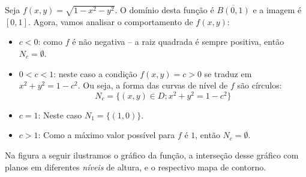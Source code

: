 \begin{example}{}{}
Seja \(f(x,y) = \sqrt{1-x^2 - y^2}\). O domínio desta função é $\overline{B(0,1)}$ e a imagem é $[0,1]$. Agora, vamos analisar o comportamento de \(f(x,y)\):
\begin{itemize}[label=\color{examplescolor}\textbullet]

\item $c<0$: como $f$ é não negativa -- a raiz quadrada é sempre positiva, então $N_c=\emptyset$.


\item $0<c<1$: neste caso a condição $f(x,y)=c>0$ se traduz em $x^2+y^2=1-c^2$. Ou seja, a forma das curvas de nível de $f$ são círculos:
$$N_c=\{(x,y)\in D; x^2+y^2=1-c^2\}$$


\item $c=1$: Neste caso $N_1=\{(1,0)\}$. 

\item $c>1$: Como a máximo valor possível para $f$ é $1$, então $N_c=\emptyset$.  
\end{itemize}

Na figura a seguir ilustramos o gráfico da função, a interseção desse gráfico com planos em diferentes \textit{níveis} de altura, e o respectivo mapa de contorno. 
\begin{center}
\end{center}
\end{example}
